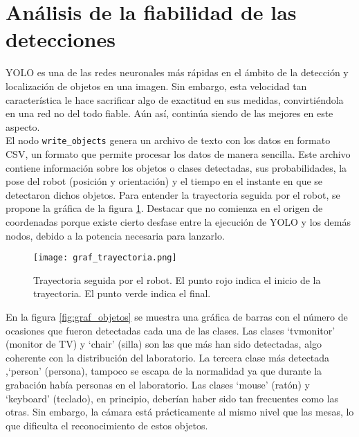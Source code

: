 \section{Análisis de la fiabilidad de las detecciones}

YOLO es una de las redes neuronales más rápidas en el ámbito de la detección y localización de objetos en una imagen. Sin embargo, esta velocidad tan característica le hace sacrificar algo de exactitud en sus medidas, convirtiéndola en una red no del todo fiable. Aún así, continúa siendo de las mejores en este aspecto.\\

El nodo \texttt{write\_objects} genera un archivo de texto con los datos en formato CSV, un formato que permite procesar los datos de manera sencilla. Este archivo contiene información sobre los objetos o clases detectadas, sus probabilidades, la pose del robot (posición y orientación) y el tiempo en el instante en que se detectaron dichos objetos. Para entender la trayectoria seguida por el robot, se propone la gráfica de la figura \ref{fig:graf_trayectoria}. Destacar que no comienza en el origen de coordenadas porque existe cierto desfase entre la ejecución de YOLO y los demás nodos, debido a la potencia necesaria para lanzarlo.\\

\begin{figure}[h]
	\begin{center} 
		\texttt{[image: graf\_trayectoria.png]}
	\end{center}
	\caption{Trayectoria seguida por el robot. El punto rojo indica el inicio de la trayectoria. El punto verde indica el final.}
	\label{fig:graf_trayectoria}
\end{figure}

En la figura \ref{fig:graf_objetos} se muestra una gráfica de barras con el número de ocasiones que fueron detectadas cada una de las clases. Las clases `tvmonitor' (monitor de TV) y `chair' (silla) son las que más han sido detectadas, algo coherente con la distribución del laboratorio. La tercera clase más detectada ,`person' (persona), tampoco se escapa de la normalidad ya que durante la grabación había personas en el laboratorio. Las clases `mouse' (ratón) y `keyboard' (teclado), en principio, deberían haber sido tan frecuentes como las otras. Sin embargo, la cámara está prácticamente al mismo nivel que las mesas, lo que dificulta el reconocimiento de estos objetos.\\


